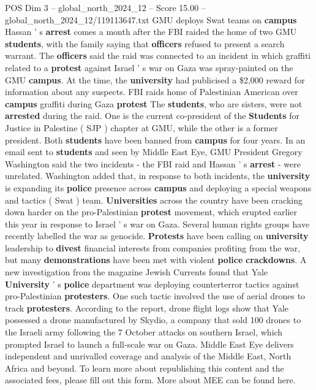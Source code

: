 \begin{textsample}{POS Dim 3 – global\_north\_2024\_12 – Score 15.00 – global\_north\_2024\_12/119113647.txt}
GMU deploys Swat teams on \textbf{campus} Hassan ' s \textbf{arrest} comes a month after the FBI raided the home of two GMU \textbf{students}, with the family saying that \textbf{officers} refused to present a search warrant.
The \textbf{officers} said the raid was connected to an incident in which graffiti related to a \textbf{protest} against Israel ' s war on Gaza was spray-painted on the GMU \textbf{campus}.
At the time, the \textbf{university} had publicised a \$2,000 reward for information about any suspects.
FBI raids home of Palestinian American over \textbf{campus} graffiti during Gaza \textbf{protest} The \textbf{students}, who are sisters, were not \textbf{arrested} during the raid.
One is the current co-president of the \textbf{Students} for Justice in Palestine ( SJP ) chapter at GMU, while the other is a former president.
Both \textbf{students} have been banned from \textbf{campus} for four years.
In an email sent to \textbf{students} and seen by Middle East Eye, GMU President Gregory Washington said the two incidents - the FBI raid and Hassan ' s \textbf{arrest} - were unrelated.
Washington added that, in response to both incidents, the \textbf{university} is expanding its \textbf{police} presence across \textbf{campus} and deploying a special weapons and tactics ( Swat ) team. \textbf{Universities} across the country have been cracking down harder on the pro-Palestinian \textbf{protest} movement, which erupted earlier this year in response to Israel ' s war on Gaza.
Several human rights groups have recently labelled the war as genocide. \textbf{Protests} have been calling on \textbf{university} leadership to \textbf{divest} financial interests from companies profiting from the war, but many \textbf{demonstrations} have been met with violent \textbf{police} \textbf{crackdowns}.
A new investigation from the magazine Jewish Currents found that Yale \textbf{University} ' s \textbf{police} department was deploying counterterror tactics against pro-Palestinian \textbf{protesters}.
One such tactic involved the use of aerial drones to track \textbf{protesters}.
According to the report, drone flight logs show that Yale possessed a drone manufactured by Skydio, a company that sold 100 drones to the Israeli army following the 7 October attacks on southern Israel, which prompted Israel to launch a full-scale war on Gaza.
Middle East Eye delivers independent and unrivalled coverage and analysis of the Middle East, North Africa and beyond.
To learn more about republishing this content and the associated fees, please fill out this form.
More about MEE can be found here.

\end{textsample}
